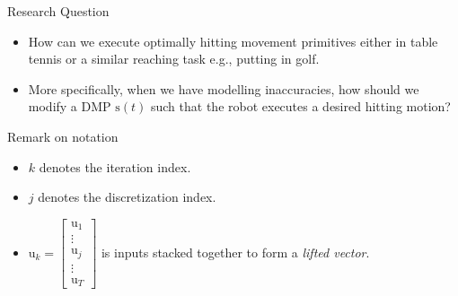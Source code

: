 \documentclass[handout]{beamer}
\newcommand{\boldvec}[1]{\boldsymbol{\mathrm{#1}}}
\let\vec\boldvec
\newcommand{\dmp}{\vec{s}} %
\newcommand{\sysInput}{\vec{u}} %
\begin{document}
%
\begin{frame}{Research Question}
\begin{itemize}
\item How can we execute optimally hitting movement primitives either in table tennis or a similar reaching task e.g., putting in golf. 
%
\item More specifically, when we have modelling inaccuracies, how should we modify a DMP $\dmp(t)$ such that the robot executes a desired hitting motion?
\end{itemize}
\end{frame}
%
\begin{frame}{Remark on notation}
\begin{itemize}
\item $k$ denotes the iteration index.
\item $j$ denotes the discretization index.
\item $\sysInput_k = \begin{bmatrix} \sysInput_1 \\ \vdots \\ \sysInput_j \\ \vdots \\ \sysInput_T \end{bmatrix}$ is inputs stacked  together to form a \emph{lifted vector}.
\end{itemize}
\end{frame}
%
\end{document}
